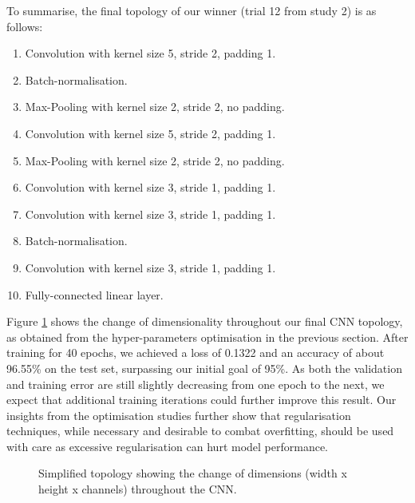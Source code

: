 \documentclass[british,12p]{article}
\begin{document}
   
    To summarise, the final topology of our winner (trial 12 from study 2) is as follows:
    \begin{enumerate}
    	\item Convolution with kernel size 5, stride 2, padding 1.
    	\item Batch-normalisation.
    	\item Max-Pooling with kernel size 2, stride 2, no padding.
    	\item Convolution with kernel size 5, stride 2, padding 1.
    	\item Max-Pooling with kernel size 2, stride 2, no padding.
    	\item Convolution with kernel size 3, stride 1, padding 1.
    	\item Convolution with kernel size 3, stride 1, padding 1.
    	\item Batch-normalisation.
    	\item Convolution with kernel size 3, stride 1, padding 1.
    	\item Fully-connected linear layer. 	
    \end{enumerate}

    Figure \ref{fig-trial-2-12-top} shows the change of dimensionality throughout our final CNN topology, as obtained from the hyper-parameters optimisation in the previous section. After training for 40 epochs, we achieved a loss of 0.1322 and an accuracy of about 96.55\% on the test set, surpassing our initial goal of 95\%. As both the validation and training error are still slightly decreasing from one epoch to the next, we expect that additional training iterations could further improve this result. Our insights from the optimisation studies further show that regularisation techniques, while necessary and desirable to combat overfitting, should be used with care as excessive regularisation can hurt model performance. 
    
    \begin{figure}[h!]
		\begin{center}
  			\caption{Simplified topology showing the change of dimensions (width x height x channels) throughout the CNN.}
  			\label{fig-trial-2-12-top}
  		\end{center}
	\end{figure}
    
\end{document}
